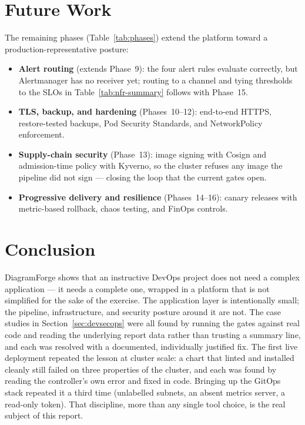 \documentclass[11pt,a4paper]{article}
\begin{document}
\section{Future Work}
The remaining phases (Table~\ref{tab:phases}) extend the platform toward a
production-representative posture:
\begin{itemize}[nosep]
    \item \textbf{Alert routing} (extends Phase~9): the four alert rules
        evaluate correctly, but Alertmanager has no receiver yet; routing to
        a channel and tying thresholds to the SLOs in
        Table~\ref{tab:nfr-summary} follows with Phase~15.
    \item \textbf{TLS, backup, and hardening} (Phases~10--12): end-to-end
        HTTPS, restore-tested backups, Pod Security Standards, and
        NetworkPolicy enforcement.
    \item \textbf{Supply-chain security} (Phase~13): image signing with
        Cosign and admission-time policy with Kyverno, so the cluster
        refuses any image the pipeline did not sign --- closing the loop
        that the current gates open.
    \item \textbf{Progressive delivery and resilience} (Phases~14--16):
        canary releases with metric-based rollback, chaos testing, and
        FinOps controls.
\end{itemize}

\section{Conclusion}
DiagramForge shows that an instructive DevOps project does not need a
complex application --- it needs a complete one, wrapped in a platform that
is not simplified for the sake of the exercise. The application layer is
intentionally small; the pipeline, infrastructure, and security posture
around it are not. The case studies in Section~\ref{sec:devsecops} were all
found by running the gates against real code and reading the underlying
report data rather than trusting a summary line, and each was resolved
with a documented, individually justified fix. The first live deployment
repeated the lesson at cluster scale: a chart that linted and installed
cleanly still failed on three properties of the cluster, and each was found
by reading the controller's own error and fixed in code. Bringing up the
GitOps stack repeated it a third time (unlabelled subnets, an absent metrics
server, a read-only token). That discipline,
more than any single tool choice, is the real subject of this report.
\end{document}
